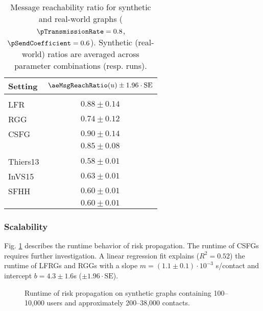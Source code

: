\begin{table}[htbp]
	\centering
	\begin{tabular}{lc}
		\toprule
		\bfseries Setting & $\aeMsgReachRatio(u) \pm 1.96 \cdot \text{SE}$\\
		\midrule
		\rowgroup{\itshape Synthetic} \\
		LFR & $0.88 \pm 0.14$\\
		RGG & $0.74 \pm 0.12$\\
		CSFG & $0.90 \pm 0.14$\\
		& $\boldsymbol{0.85 \pm 0.08}$ \\
		\midrule
		\rowgroup{\itshape Real-world} \\
		Thiers13 & $0.58 \pm 0.01$\\
		InVS15 & $0.63 \pm 0.01$\\
		SFHH & $0.60 \pm 0.01$\\
		& $\boldsymbol{0.60 \pm 0.01}$ \\
		\bottomrule
	\end{tabular}
	\caption[Message reachability ratio for synthetic and real-world graphs]{Message reachability ratio for synthetic and real-world graphs ($\pTransmissionRate = 0.8$, $\pSendCoefficient = 0.6$). Synthetic (real-world) ratios are averaged across parameter combinations (resp. runs).}
	\label{tab:reachability}
\end{table}

\subsubsection{Scalability}

Fig. \ref{fig:runtime} describes the runtime behavior of risk propagation. The runtime of CSFGs requires further investigation. A linear regression fit explains ($R^2 = 0.52$) the runtime of LFRGs and RGGs with a slope $m = (1.1 \pm 0.1) \cdot 10^{-3}$ s/contact and intercept $b = 4.3 \pm 1.6$s ($\pm 1.96 \cdot \text{SE}$).

\begin{figure}[htbp]
	\centering
	\caption[Runtime of risk propagation]{Runtime of risk propagation on synthetic graphs containing 100--10,000 users and approximately 200--38,000 contacts.}
	\label{fig:runtime}
\end{figure}

